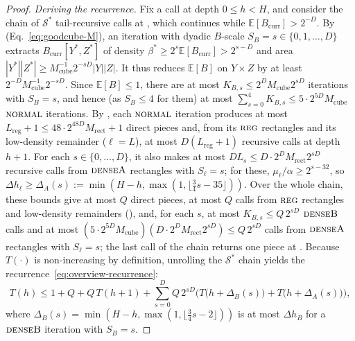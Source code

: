 \documentclass[11pt]{article}
\theoremstyle{definition}
\newcommand{\E}{\mathbb{E}}
\newcommand{\abs}[1]{\left\lvert #1 \right\rvert}
\newcommand{\dens}[1]{\E[#1]}
\newcommand{\tagreg}{\textnormal{\textsc{reg}}}
\newcommand{\tagdenseA}{\textnormal{\textsc{denseA}}}
\newcommand{\tagdenseB}{\textnormal{\textsc{denseB}}}
\newcommand{\tagnormal}{\textnormal{\textsc{normal}}}
\begin{document}
\begin{proof}
\emph{Deriving the recurrence.} Fix a call at depth $0 \le h < H$, and consider the chain of $\mathcal{S}^*$ tail-recursive calls at , which continues while $\dens{B_{\text{curr}}} > 2^{-D}$. By  (Eq.~\eqref{eq:goodcube-M}), an iteration with dyadic $B$-scale $S_B = s \in \{0, 1, \dots, D\}$ extracts $B_{\text{curr}}[Y^*, Z^*]$ of density $\beta^* \ge 2^s\dens{B_{\text{curr}}} > 2^{s-D}$ and area $\abs{Y^*}\abs{Z^*} \ge M_{\text{cube}}^{-1} 2^{-s D}\abs{Y}\abs{Z}$. It thus reduces $\dens{B}$ on $Y \times Z$ by at least $2^{-D} M_{\text{cube}}^{-1} 2^{-s D}$. Since $\dens{B} \le 1$, there are at most $K_{B, s} \le 2^D M_{\text{cube}} 2^{s D}$ iterations with $S_B = s$, and hence (as $S_B \le 4$ for them) at most $\sum_{s=0}^4 K_{B, s} \le 5 \cdot 2^{5D} M_{\text{cube}}$ $\tagnormal$ iterations. By , each $\tagnormal$ iteration produces at most $L_{\text{reg}} + 1 \le 48 \cdot 2^{48D} M_{\text{rect}} + 1$ direct pieces and, from its $\tagreg$ rectangles and its low-density remainder ($\ell = L$), at most $D(L_{\text{reg}} + 1)$ recursive calls at depth $h + 1$. For each $s \in \{0, \dots, D\}$, it also makes at most $D L_s \le D \cdot 2^D M_{\text{rect}} 2^{s D}$ recursive calls from $\tagdenseA$ rectangles with $S_\ell = s$; for these, $\mu_\ell/\alpha \ge 2^{s - 32}$, so $\Delta h_\ell \ge \Delta_A(s) := \min(H-h, \max(1, \lfloor \frac{3}{4}s - 35 \rfloor))$. Over the whole chain, these bounds give at most $Q$ direct pieces, at most $Q$ calls from $\tagreg$ rectangles and low-density remainders (), and, for each $s$, at most $K_{B, s} \le Q\,2^{s D}$ $\tagdenseB$ calls and at most $(5 \cdot 2^{5D} M_{\text{cube}})(D \cdot 2^D M_{\text{rect}} 2^{s D}) \le Q\,2^{s D}$ calls from $\tagdenseA$ rectangles with $S_\ell = s$; the last call of the chain returns one piece at . Because $T(\cdot)$ is non-increasing by definition, unrolling the $\mathcal{S}^*$ chain yields the recurrence~\eqref{eq:overview-recurrence}:
\[
    T(h) \le 1 + Q + Q\,T(h + 1) + \sum_{s=0}^{D} Q\,2^{s D}\Big(T\big(h + \Delta_B(s)\big) + T\big(h + \Delta_A(s)\big)\Big),
\]
where $\Delta_B(s) = \min(H-h, \max(1, \lfloor \frac{3}{4}s - 2 \rfloor))$ is at most $\Delta h_B$ for a $\tagdenseB$ iteration with $S_B = s$.


\end{proof}
\end{document}
